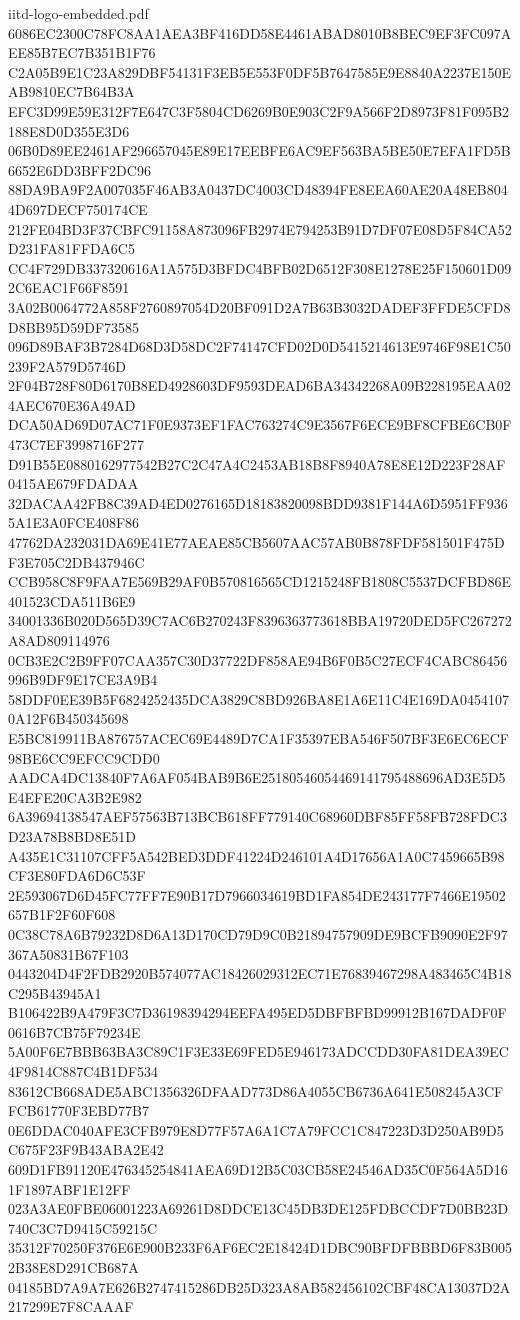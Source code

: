 \begin{filecontents*}[overwrite]{iitd-logo-embedded.pdf}
6086EC2300C78FC8AA1AEA3BF416DD58E4461ABAD8010B8BEC9EF3FC097AEE85B7EC7B351B1F76
C2A05B9E1C23A829DBF54131F3EB5E553F0DF5B7647585E9E8840A2237E150EAB9810EC7B64B3A
EFC3D99E59E312F7E647C3F5804CD6269B0E903C2F9A566F2D8973F81F095B2188E8D0D355E3D6
06B0D89EE2461AF296657045E89E17EEBFE6AC9EF563BA5BE50E7EFA1FD5B6652E6DD3BFF2DC96
88DA9BA9F2A007035F46AB3A0437DC4003CD48394FE8EEA60AE20A48EB8044D697DECF750174CE
212FE04BD3F37CBFC91158A873096FB2974E794253B91D7DF07E08D5F84CA52D231FA81FFDA6C5
CC4F729DB337320616A1A575D3BFDC4BFB02D6512F308E1278E25F150601D092C6EAC1F66F8591
3A02B0064772A858F2760897054D20BF091D2A7B63B3032DADEF3FFDE5CFD8D8BB95D59DF73585
096D89BAF3B7284D68D3D58DC2F74147CFD02D0D5415214613E9746F98E1C50239F2A579D5746D
2F04B728F80D6170B8ED4928603DF9593DEAD6BA34342268A09B228195EAA024AEC670E36A49AD
DCA50AD69D07AC71F0E9373EF1FAC763274C9E3567F6ECE9BF8CFBE6CB0F473C7EF3998716F277
D91B55E0880162977542B27C2C47A4C2453AB18B8F8940A78E8E12D223F28AF0415AE679FDADAA
32DACAA42FB8C39AD4ED0276165D18183820098BDD9381F144A6D5951FF9365A1E3A0FCE408F86
47762DA232031DA69E41E77AEAE85CB5607AAC57AB0B878FDF581501F475DF3E705C2DB437946C
CCB958C8F9FAA7E569B29AF0B570816565CD1215248FB1808C5537DCFBD86E401523CDA511B6E9
34001336B020D565D39C7AC6B270243F8396363773618BBA19720DED5FC267272A8AD809114976
0CB3E2C2B9FF07CAA357C30D37722DF858AE94B6F0B5C27ECF4CABC86456996B9DF9E17CE3A9B4
58DDF0EE39B5F6824252435DCA3829C8BD926BA8E1A6E11C4E169DA04541070A12F6B450345698
E5BC819911BA876757ACEC69E4489D7CA1F35397EBA546F507BF3E6EC6ECF98BE6CC9EFCC9CDD0
AADCA4DC13840F7A6AF054BAB9B6E25180546054469141795488696AD3E5D5E4EFE20CA3B2E982
6A39694138547AEF57563B713BCB618FF779140C68960DBF85FF58FB728FDC3D23A78B8BD8E51D
A435E1C31107CFF5A542BED3DDF41224D246101A4D17656A1A0C7459665B98CF3E80FDA6D6C53F
2E593067D6D45FC77FF7E90B17D7966034619BD1FA854DE243177F7466E19502657B1F2F60F608
0C38C78A6B79232D8D6A13D170CD79D9C0B21894757909DE9BCFB9090E2F97367A50831B67F103
0443204D4F2FDB2920B574077AC18426029312EC71E76839467298A483465C4B18C295B43945A1
B106422B9A479F3C7D36198394294EEFA495ED5DBFBFBD99912B167DADF0F0616B7CB75F79234E
5A00F6E7BBB63BA3C89C1F3E33E69FED5E946173ADCCDD30FA81DEA39EC4F9814C887C4B1DF534
83612CB668ADE5ABC1356326DFAAD773D86A4055CB6736A641E508245A3CFFCB61770F3EBD77B7
0E6DDAC040AFE3CFB979E8D77F57A6A1C7A79FCC1C847223D3D250AB9D5C675F23F9B43ABA2E42
609D1FB91120E476345254841AEA69D12B5C03CB58E24546AD35C0F564A5D161F1897ABF1E12FF
023A3AE0FBE06001223A69261D8DDCE13C45DB3DE125FDBCCDF7D0BB23D740C3C7D9415C59215C
35312F70250F376E6E900B233F6AF6EC2E18424D1DBC90BFDFBBBD6F83B0052B38E8D291CB687A
04185BD7A9A7E626B2747415286DB25D323A8AB582456102CBF48CA13037D2A217299E7F8CAAAF

\end{filecontents*}
